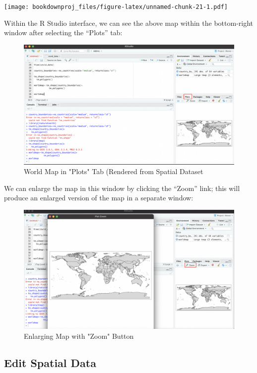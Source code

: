 \documentclass[
]{article}
\begin{document}
\texttt{[image: bookdownproj\_files/figure-latex/unnamed-chunk-21-1.pdf]}

Within the R Studio interface, we can see the above map within the bottom-right window after selecting the ``Plots'' tab:

\begin{figure}
\includegraphics[width=1\linewidth]{images/worldmap_window} \caption{World Map in "Plots" Tab (Rendered from Spatial Dataset}\label{fig:unnamed-chunk-22}
\end{figure}

We can enlarge the map in this window by clicking the ``Zoom'' link; this will produce an enlarged version of the map in a separate window:

\begin{figure}
\includegraphics[width=1\linewidth]{images/zoom2} \caption{Enlarging Map with "Zoom" Button}\label{fig:unnamed-chunk-23}
\end{figure}

\hypertarget{edit-spatial-data}{%
\subsection{Edit Spatial Data}\label{edit-spatial-data}}
\end{document}
